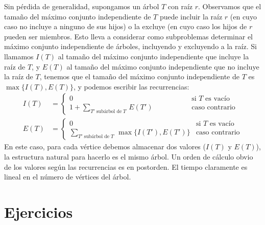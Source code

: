   Sin pérdida de generalidad,
  supongamos un árbol \(T\) con raíz \(r\).
  Observamos que el tamaño del máximo conjunto independiente de \(T\)
  puede incluir la raíz \(r\)
  (en cuyo caso no incluye a ninguno de sus hijos)
  o la excluye
  (en cuyo caso los hijos de \(r\) pueden ser miembros.
  Esto lleva a considerar como subproblemas
  determinar el máximo conjunto independiente de árboles,
  incluyendo y excluyendo a la raíz.
  Si llamamos \(I(T)\) al tamaño del máximo conjunto independiente
  que incluye la raíz de \(T\),
  y \(E(T)\) al tamaño del máximo conjunto independiente
  que no incluye la raíz de \(T\),
  tenemos que el tamaño del máximo conjunto independiente de \(T\)
  es \(\max \{ I(T), E(T) \}\),
  y podemos escribir las recurrencias:
  \begin{align*}
    I(T)
      & = \begin{cases}
	    0	 & \text{si \(T\) es vacío} \\
	    1 + \sum_{T' \mathop{\text{subárbol de}} T} \, E(T')
		\phantom{\max \{, E \}}	 %
		 & \text{caso contrario}
	  \end{cases} \\
    E(T)
      & = \begin{cases}
	    0	 & \text{si \(T\) es vacío} \\
	    \sum_{T' \mathop{\text{subárbol de}} T} \,
		     \max \{ I(T'), E(T') \}
		 & \text{caso contrario}
	  \end{cases}
  \end{align*}
  En este caso,
  para cada vértice debemos almacenar dos valores
  (\(I(T)\) y \(E(T)\)),
  la estructura natural para hacerlo es el mismo árbol.
  Un orden de cálculo obvio de los valores según las recurrencias
  es en postorden.
  El tiempo claramente es lineal en el número de vértices del árbol.

\section*{Ejercicios}
\label{sec:ejercicios-programacion-dinamica}

